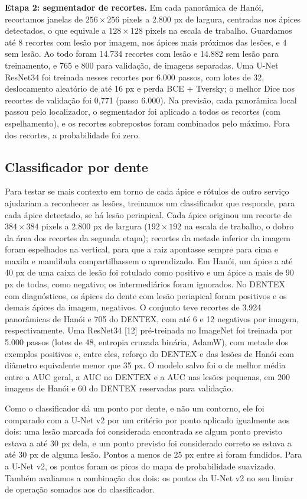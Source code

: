 \documentclass[twocolumn]{article}
\begin{document}
\textbf{Etapa 2: segmentador de recortes.} Em cada panorâmica de Hanói, recortamos janelas de $256 \times 256$ pixels a 2.800 px de largura, centradas nos ápices detectados, o que equivale a $128 \times 128$ pixels na escala de trabalho. Guardamos até 8 recortes com lesão por imagem, nos ápices mais próximos das lesões, e 4 sem lesão. Ao todo foram 14.734 recortes com lesão e 14.882 sem lesão para treinamento, e 765 e 800 para validação, de imagens separadas. Uma U-Net ResNet34 foi treinada nesses recortes por 6.000 passos, com lotes de 32, deslocamento aleatório de até 16 px e perda BCE + Tversky; o melhor Dice nos recortes de validação foi 0,771 (passo 6.000). Na previsão, cada panorâmica local passou pelo localizador, o segmentador foi aplicado a todos os recortes (com espelhamento), e os recortes sobrepostos foram combinados pelo máximo. Fora dos recortes, a probabilidade foi zero.

\subsection{Classificador por dente}

Para testar se mais contexto em torno de cada ápice e rótulos de outro serviço ajudariam a reconhecer as lesões, treinamos um classificador que responde, para cada ápice detectado, se há lesão periapical. Cada ápice originou um recorte de $384 \times 384$ pixels a 2.800 px de largura ($192 \times 192$ na escala de trabalho, o dobro da área dos recortes da segunda etapa); recortes da metade inferior da imagem foram espelhados na vertical, para que a raiz apontasse sempre para cima e maxila e mandíbula compartilhassem o aprendizado. Em Hanói, um ápice a até 40 px de uma caixa de lesão foi rotulado como positivo e um ápice a mais de 90 px de todas, como negativo; os intermediários foram ignorados. No DENTEX com diagnósticos, os ápices do dente com lesão periapical foram positivos e os demais ápices da imagem, negativos. O conjunto teve recortes de 3.924 panorâmicas de Hanói e 705 do DENTEX, com até 6 e 12 negativos por imagem, respectivamente. Uma ResNet34 [12] pré-treinada no ImageNet foi treinada por 5.000 passos (lotes de 48, entropia cruzada binária, AdamW), com metade dos exemplos positivos e, entre eles, reforço do DENTEX e das lesões de Hanói com diâmetro equivalente menor que 35 px. O modelo salvo foi o de melhor média entre a AUC geral, a AUC no DENTEX e a AUC nas lesões pequenas, em 200 imagens de Hanói e 60 do DENTEX reservadas para validação.

Como o classificador dá um ponto por dente, e não um contorno, ele foi comparado com a U-Net v2 por um critério por ponto aplicado igualmente aos dois: uma lesão marcada foi considerada encontrada se algum ponto previsto estava a até 30 px dela, e um ponto previsto foi considerado correto se estava a até 30 px de alguma lesão. Pontos a menos de 25 px entre si foram fundidos. Para a U-Net v2, os pontos foram os picos do mapa de probabilidade suavizado. Também avaliamos a combinação dos dois: os pontos da U-Net v2 no seu limiar de operação somados aos do classificador.
\end{document}
